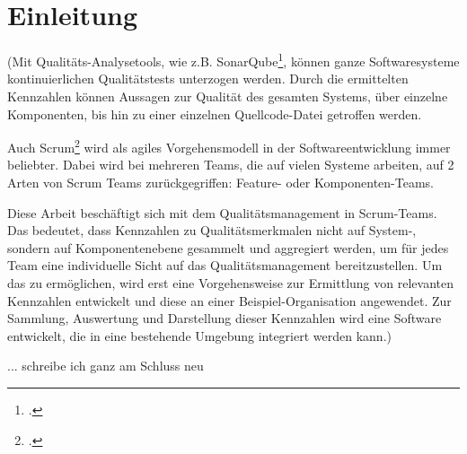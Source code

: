 \chapter{Einleitung}

(Mit Qualitäts-Analysetools, wie z.B. SonarQube\footcite{sonarqube}, können ganze Softwaresysteme kontinuierlichen Qualitätstests unterzogen werden.
Durch die ermittelten Kennzahlen können Aussagen zur Qualität des gesamten Systems, über einzelne Komponenten, bis hin zu einer einzelnen Quellcode-Datei getroffen werden.

Auch Scrum\footcite{scrum} wird als agiles Vorgehensmodell in der Softwareentwicklung immer beliebter. 
Dabei wird bei mehreren Teams, die auf vielen Systeme arbeiten, auf 2 Arten von Scrum Teams zurückgegriffen:
Feature- oder Komponenten-Teams.

Diese Arbeit beschäftigt sich mit dem Qualitätsmanagement in Scrum-Teams.
Das bedeutet, dass Kennzahlen zu Qualitätsmerkmalen nicht auf System-, sondern auf Komponentenebene gesammelt und aggregiert werden, um für jedes Team eine individuelle Sicht auf das Qualitätsmanagement bereitzustellen.
Um das zu ermöglichen, wird erst eine Vorgehensweise zur Ermittlung von relevanten Kennzahlen entwickelt und diese an einer Beispiel-Organisation angewendet.
Zur Sammlung, Auswertung und Darstellung dieser Kennzahlen wird eine Software entwickelt, die in eine bestehende Umgebung integriert werden kann.)

... schreibe ich ganz am Schluss neu
